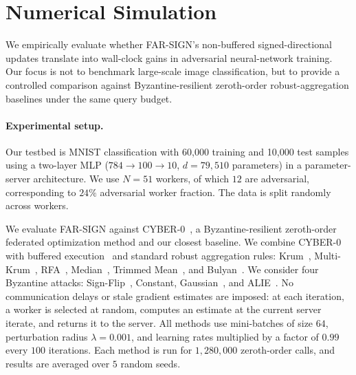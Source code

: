 \documentclass{article}
\newcommand{\farsign}{FAR-SIGN\xspace}
\begin{document}
\section{Numerical Simulation}
\label{sec:numericalsec}

We empirically evaluate whether \farsign{}'s non-buffered signed-directional updates translate into wall-clock gains in adversarial neural-network training. 
Our focus is not to benchmark large-scale image classification, but to provide a controlled comparison against Byzantine-resilient zeroth-order robust-aggregation baselines under the same query budget.

\paragraph{Experimental setup.}

Our testbed is MNIST classification \citep{lecun1998mnist} with 60,000 training and 10,000 test samples using a two-layer MLP 
($784 \to 100 \to 10$, $d=79{,}510$ parameters) in a parameter-server architecture. 
We use $N=51$ workers, of which $12$ are adversarial, corresponding to $24\%$ adversarial worker fraction. 
The data is split randomly across workers.

We evaluate \farsign{} against CYBER-0~\citep{neto2024communicationefficientbyzantineresilientfederatedzeroorder}, a Byzantine-resilient zeroth-order federated optimization method and our closest baseline. 
We combine CYBER-0 with buffered execution~\citep{yang2023buffered} and standard robust aggregation rules: Krum~\citep{blanchard2017machine}, Multi-Krum~\citep{blanchard2017machine}, RFA~\citep{pillutla2022robust}, Median~\citep{yin2018byzantine}, Trimmed Mean~\citep{yin2018byzantine}, and Bulyan~\citep{mhamdi2018hidden}. 
We consider four Byzantine attacks: Sign-Flip~\citep{damaskinos2018asynchronous}, Constant, Gaussian~\citep{blanchard2017machine}, and ALIE~\citep{baruch2019little}. 
No communication delays or stale gradient estimates are imposed: at each iteration, a worker is selected at random, computes an estimate at the current server iterate, and returns it to the server. 
All methods use mini-batches of size $64$, perturbation radius $\lambda=0.001$, and learning rates multiplied by a factor of $0.99$ every $100$ iterations. 
Each method is run for $1{,}280{,}000$ zeroth-order calls, and results are averaged over $5$ random seeds.
\end{document}
